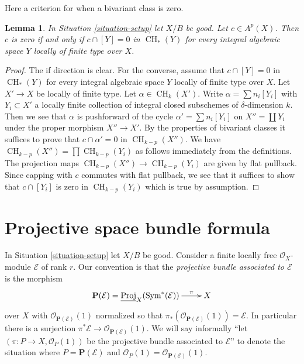\documentclass{stacks-project}
\theoremstyle{plain}
\newtheorem{lemma}[subsection]{Lemma}
\theoremstyle{definition}
\theoremstyle{remark}
\numberwithin{equation}{subsection}
\def\CH{\mathop{\mathrm{CH}}\nolimits}
\begin{document}
\noindent
Here a criterion for when a bivariant class is zero.

\begin{lemma}
\label{lemma-bivariant-zero}
In Situation \ref{situation-setup} let $X/B$ be good. Let $c \in A^p(X)$.
Then $c$ is zero if and only if $c \cap [Y] = 0$ in $\CH_*(Y)$
for every integral algebraic space $Y$ locally of finite type over $X$.
\end{lemma}

\begin{proof}
The if direction is clear. For the converse, assume that $c \cap [Y] = 0$ in
$\CH_*(Y)$ for every integral algebraic space $Y$ locally of finite type
over $X$.
Let $X' \to X$ be locally of finite type. Let $\alpha \in \CH_k(X')$.
Write $\alpha = \sum n_i [Y_i]$ with $Y_i \subset X'$ a locally finite
collection of integral closed subschemes of $\delta$-dimension $k$.
Then we see that $\alpha$ is pushforward of the cycle
$\alpha' = \sum n_i[Y_i]$ on $X'' = \coprod Y_i$ under the
proper morphism $X'' \to X'$. By the properties of bivariant
classes it suffices to prove that $c \cap \alpha' = 0$ in $\CH_{k - p}(X'')$.
We have $\CH_{k - p}(X'') = \prod \CH_{k - p}(Y_i)$ as follows immediately
from the definitions. The projection maps
$\CH_{k - p}(X'') \to \CH_{k - p}(Y_i)$
are given by flat pullback. Since capping with $c$ commutes with
flat pullback, we see that it suffices to show that $c \cap [Y_i]$
is zero in $\CH_{k - p}(Y_i)$ which is true by assumption.
\end{proof}















\section{Projective space bundle formula}
\label{section-projective-space-bundle-formula}

\noindent
In Situation \ref{situation-setup} let $X/B$ be good.
Consider a finite locally free $\mathcal{O}_X$-module
$\mathcal{E}$ of rank $r$.
Our convention is that the {\it projective bundle associated to
$\mathcal{E}$} is the morphism
$$
\xymatrix{
\mathbf{P}(\mathcal{E}) =
\underline{\text{Proj}}_X(\text{Sym}^*(\mathcal{E}))
\ar[r]^-\pi
& X
}
$$
over $X$ with
$\mathcal{O}_{\mathbf{P}(\mathcal{E})}(1)$ normalized so that
$\pi_*(\mathcal{O}_{\mathbf{P}(\mathcal{E})}(1)) = \mathcal{E}$.
In particular there is a surjection
$\pi^*\mathcal{E} \to \mathcal{O}_{\mathbf{P}(\mathcal{E})}(1)$.
We will say informally ``let $(\pi : P \to X, \mathcal{O}_P(1))$
be the projective bundle associated to $\mathcal{E}$'' to denote
the situation where $P = \mathbf{P}(\mathcal{E})$ and
$\mathcal{O}_P(1) = \mathcal{O}_{\mathbf{P}(\mathcal{E})}(1)$.
\end{document}
